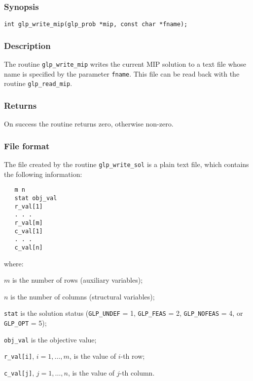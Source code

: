 \subsubsection*{Synopsis}

\begin{verbatim}
int glp_write_mip(glp_prob *mip, const char *fname);
\end{verbatim}

\subsubsection*{Description}

The routine \verb|glp_write_mip| writes the current MIP solution to a
text file whose name is specified by the parameter \verb|fname|. This
file can be read back with the routine \verb|glp_read_mip|.

\subsubsection*{Returns}

On success the routine returns zero, otherwise non-zero.

\subsubsection*{File format}

The file created by the routine \verb|glp_write_sol| is a plain text
file, which contains the following information:

\begin{verbatim}
   m n
   stat obj_val
   r_val[1]
   . . .
   r_val[m]
   c_val[1]
   . . .
   c_val[n]
\end{verbatim}

\noindent
where:

\noindent
$m$ is the number of rows (auxiliary variables);

\noindent
$n$ is the number of columns (structural variables);

\noindent
\verb|stat| is the solution status (\verb|GLP_UNDEF| = 1,
\verb|GLP_FEAS| = 2, \verb|GLP_NOFEAS| = 4, or \verb|GLP_OPT| = 5);

\noindent
\verb|obj_val| is the objective value;

\noindent
\verb|r_val[i]|, $i=1,\dots,m$, is the value of $i$-th row;

\noindent
\verb|c_val[j]|, $j=1,\dots,n$, is the value of $j$-th column.

